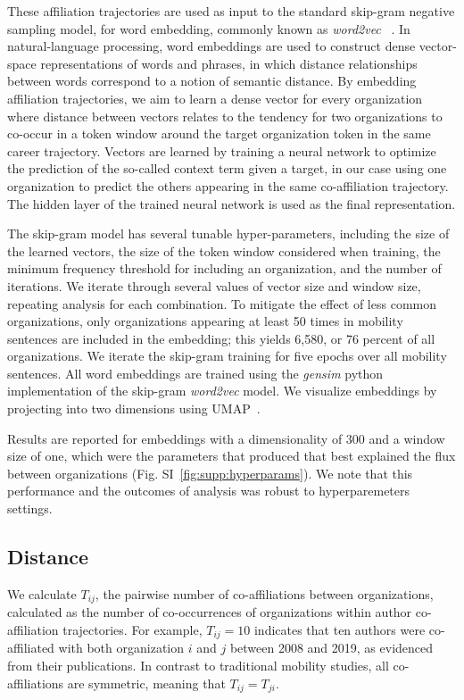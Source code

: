 \documentclass[12pt]{article} %
\begin{document}
These affiliation trajectories are used as input to the standard skip-gram negative sampling model, for word embedding, commonly known as \textit{word2vec}~\autocite{mikolov2013word2vec} .
In natural-language processing, word embeddings are used to construct dense vector-space representations of words and phrases, in which distance relationships between words correspond to a notion of semantic distance.
By embedding affiliation trajectories, we aim to learn a dense vector for every organization where distance between vectors relates to the tendency for two organizations to co-occur in a token window around the target organization token in the same career trajectory.
Vectors are learned by training a neural network to optimize the prediction of the so-called context term given a target, in our case using one organization to predict the others appearing in the same co-affiliation trajectory.
The hidden layer of the trained neural network is used as the final representation. 

The skip-gram model has several tunable hyper-parameters, including the size of the learned vectors, the size of the token window  considered when training, the minimum frequency threshold for including an organization, and the number of iterations.
We iterate through several values of vector size and window size, repeating analysis for each combination.
To mitigate the effect of less common organizations, only organizations appearing at least 50 times in mobility sentences are included in the embedding;
this yields 6,580, or 76 percent of all organizations.
We iterate the skip-gram training for five epochs over all mobility sentences.
All word embeddings are trained using the \textit{gensim} python implementation of the skip-gram \textit{word2vec} model.
We visualize embeddings by projecting into two dimensions using UMAP~\autocite{mcinnes2018umap}.

Results are reported for embeddings with a dimensionality of 300 and a window size of one, which were the parameters that produced  that best explained the flux between organizations (Fig. SI~\ref{fig:supp:hyperparams}).
We note that this performance and the outcomes of analysis was robust to hyperparemeters settings.



%
%
\subsection*{Distance}
We calculate $T_{ij}$, the pairwise number of co-affiliations between organizations, calculated as the number of co-occurrences of organizations within author co-affiliation trajectories.
For example, $T_{ij} = 10$ indicates that ten authors were co-affiliated with both organization $i$ and $j$ between 2008 and 2019, as evidenced from their publications.
In contrast to traditional mobility studies, all co-affiliations are symmetric, meaning that $T_{ij} = T_{ji}$.
\end{document}
